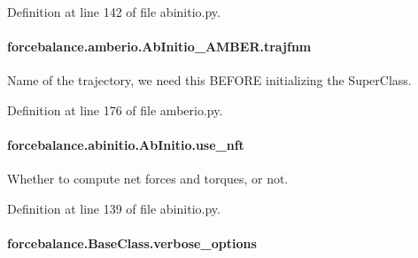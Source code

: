 Definition at line 142 of file abinitio.\-py.

\hypertarget{classforcebalance_1_1amberio_1_1AbInitio__AMBER_a5521a1a249650355e3e1f20eb3a0c25b}{
\paragraph[{trajfnm}]{\setlength{\rightskip}{0pt plus 5cm}forcebalance.\-amberio.\-Ab\-Initio\-\_\-\-A\-M\-B\-E\-R.\-trajfnm}}\label{classforcebalance_1_1amberio_1_1AbInitio__AMBER_a5521a1a249650355e3e1f20eb3a0c25b}


Name of the trajectory, we need this B\-E\-F\-O\-R\-E initializing the Super\-Class. 



Definition at line 176 of file amberio.\-py.

\hypertarget{classforcebalance_1_1abinitio_1_1AbInitio_afd8d179560a295ffa6c6309843c59279}{
\paragraph[{use\-\_\-nft}]{\setlength{\rightskip}{0pt plus 5cm}forcebalance.\-abinitio.\-Ab\-Initio.\-use\-\_\-nft\hspace{0.3cm}{\ttfamily [inherited]}}}\label{classforcebalance_1_1abinitio_1_1AbInitio_afd8d179560a295ffa6c6309843c59279}


Whether to compute net forces and torques, or not. 



Definition at line 139 of file abinitio.\-py.

\hypertarget{classforcebalance_1_1BaseClass_afd68efa29ccd2f320f4cf82198214aac}{
\paragraph[{verbose\-\_\-options}]{\setlength{\rightskip}{0pt plus 5cm}forcebalance.\-Base\-Class.\-verbose\-\_\-options\hspace{0.3cm}{\ttfamily [inherited]}}}\label{classforcebalance_1_1BaseClass_afd68efa29ccd2f320f4cf82198214aac}


